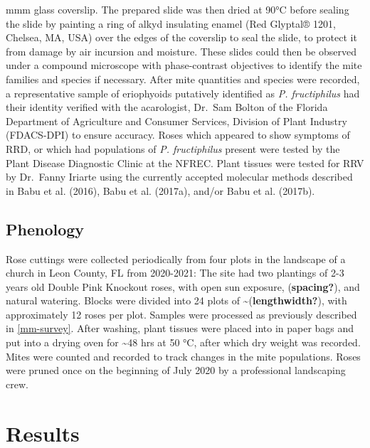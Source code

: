 \documentclass[12pt,final,CPage]{ufthesis}
\begin{document}
{m\si{\milli\metre} glass coverslip. The prepared slide was then dried at 90°C before sealing the slide by painting a ring of alkyd insulating enamel (Red Glyptal® 1201, Chelsea, MA, USA) over the edges of the coverslip to seal the slide, to protect it from damage by air incursion and moisture. These slides could then be observed under a compound microscope with phase-contrast objectives to identify the mite families and species if necessary. After mite quantities and species were recorded, a representative sample of eriophyoids putatively identified as \emph{P. fructiphilus} had their identity verified with the acarologist, Dr.~Sam Bolton of the Florida Department of Agriculture and Consumer Services, Division of Plant Industry (FDACS-DPI) to ensure accuracy. Roses which appeared to show symptoms of RRD, or which had populations of \emph{P. fructiphilus} present were tested by the Plant Disease Diagnostic Clinic at the NFREC. Plant tissues were tested for RRV by Dr.~Fanny Iriarte using the currently accepted molecular methods described in Babu et al. (2016), Babu et al. (2017a), and/or Babu et al. (2017b).

  \hypertarget{mm-pheno}{%
  \subsection{Phenology}\label{mm-pheno}}

  Rose cuttings were collected periodically from four plots in the landscape of a church in Leon County, FL from 2020-2021: The site had two plantings of 2-3 years old Double Pink Knockout roses, with open sun exposure, (\textbf{spacing?}), and natural watering. Blocks were divided into 24 plots of \textasciitilde{}(\textbf{lengthwidth?}), with approximately 12 roses per plot. Samples were processed as previously described in \ref{mm-survey}. After washing, plant tissues were placed into in paper bags and put into a drying oven for \textasciitilde48 hrs at 50 °C, after which dry weight was recorded. Mites were counted and recorded to track changes in the mite populations. Roses were pruned once on the beginning of July 2020 by a professional landscaping crew.

  \hypertarget{results-survey-pheno}{%
  \section{Results}\label{results-survey-pheno}}

}
\end{document}
